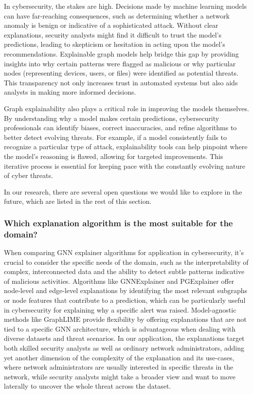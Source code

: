 In cybersecurity, the stakes are high. Decisions made by machine learning models can have far-reaching consequences, such as determining whether a network anomaly is benign or indicative of a sophisticated attack. Without clear explanations, security analysts might find it difficult to trust the model's predictions, leading to skepticism or hesitation in acting upon the model's recommendations. Explainable graph models help bridge this gap by providing insights into why certain patterns were flagged as malicious or why particular nodes (representing devices, users, or files) were identified as potential threats. This transparency not only increases trust in automated systems but also aids analysts in making more informed decisions.

Graph explainability also plays a critical role in improving the models themselves. By understanding why a model makes certain predictions, cybersecurity professionals can identify biases, correct inaccuracies, and refine algorithms to better detect evolving threats. For example, if a model consistently fails to recognize a particular type of attack, explainability tools can help pinpoint where the model's reasoning is flawed, allowing for targeted improvements. This iterative process is essential for keeping pace with the constantly evolving nature of cyber threats.

In our research, there are several open questions we would like to explore in the future, which are listed in the rest of this section.

\subsubsection{Which explanation algorithm is the most suitable for the domain?}

When comparing GNN explainer algorithms for application in cybersecurity, it's crucial to consider the specific needs of the domain, such as the interpretability of complex, interconnected data and the ability to detect subtle patterns indicative of malicious activities. Algorithms like GNNExplainer and PGExplainer offer node-level and edge-level explanations by identifying the most relevant subgraphs or node features that contribute to a prediction, which can be particularly useful in cybersecurity for explaining why a specific alert was raised. Model-agnostic methods like GraphLIME provide flexibility by offering explanations that are not tied to a specific GNN architecture, which is advantageous when dealing with diverse datasets and threat scenarios. In our application, the explanations target both skilled security analysts as well as ordinary network administrators, adding yet another dimension of the complexity of the explanation and its use-cases, where network administrators are usually interested in specific threats in the network, while security analysts might take a broader view and want to move laterally to uncover the whole threat across the dataset.

